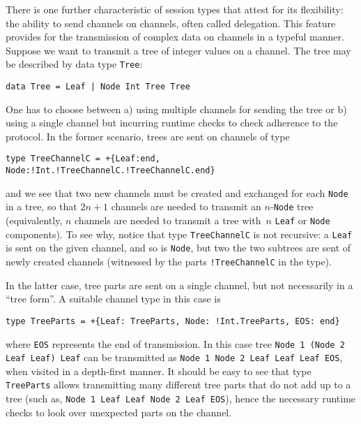 There is one further characteristic of session types that attest for
its flexibility: the ability to send channels on channels, often
called delegation. This feature provides for the transmission of
complex data on channels in a typeful manner. Suppose we want to
transmit a tree of integer values on a channel. The tree may be
described by data type \lstinline|Tree|:
%
\begin{lstlisting}
data Tree = Leaf | Node Int Tree Tree
\end{lstlisting}

One has to choose between a) using multiple channels for
sending the tree or b) using a single channel but incurring runtime
checks to check adherence to the protocol. In the former scenario,
trees are sent on channels of type
%
\begin{lstlisting}[morekeywords=end]
type TreeChannelC = +{Leaf:end, Node:!Int.!TreeChannelC.!TreeChannelC.end}
\end{lstlisting}
%
and we see that two new channels must be created and exchanged for
each \lstinline|Node| in a tree, so that $2n+1$ channels are needed to
transmit an $n$-\lstinline|Node| tree (equivalently, $n$ channels are
needed to transmit a tree with~$n$ \lstinline|Leaf| or
\lstinline|Node| components).
%
To see why, notice that type \lstinline|TreeChannelC| is not
recursive: a \lstinline|Leaf| is sent on the given channel, and so is
\lstinline|Node|, but two the two subtrees are sent of newly created
channels (witnessed by the parts \lstinline|!TreeChannelC| in the type).

In the latter case, tree parts are sent on a single channel, but not
necessarily in a ``tree form''. A suitable channel type in this case
is
%
\begin{lstlisting}[morekeywords=end]
type TreeParts = +{Leaf: TreeParts, Node: !Int.TreeParts, EOS: end}
\end{lstlisting}
%
where \lstinline|EOS| represents the end of transmission. In this case
tree \lstinline|Node 1 (Node 2 Leaf Leaf) Leaf| can be transmitted as
\lstinline|Node 1 Node 2 Leaf Leaf Leaf EOS|, when visited in a
depth-first manner. It should be easy to see that type
\lstinline|TreeParts| allows transmitting many different tree parts
that do not add up to a tree (such as,
%
\lstinline|Node 1 Leaf Leaf Node 2 Leaf EOS|), hence the necessary
runtime checks to look over unexpected parts on the channel.

